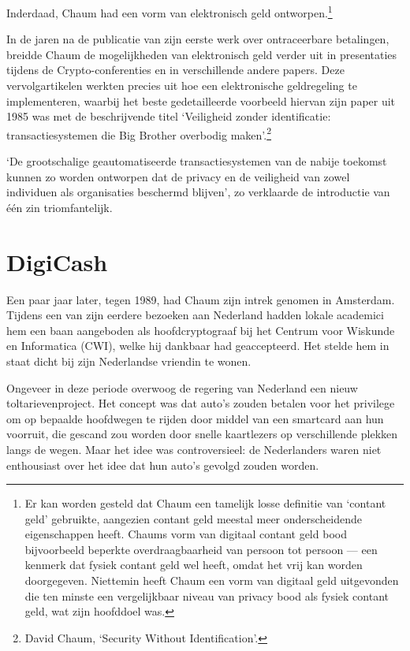 \documentclass[
  a5paper,
  smalldemyvopaper,11pt,twoside,onecolumn,openright,extrafontsizes]{memoir}
\begin{document}
Inderdaad, Chaum had een vorm van elektronisch geld
ontworpen.\footnote{Er kan worden gesteld dat Chaum een tamelijk losse
  definitie van `contant geld' gebruikte, aangezien contant geld meestal
  meer onderscheidende eigenschappen heeft. Chaums vorm van digitaal
  contant geld bood bijvoorbeeld beperkte overdraagbaarheid van persoon
  tot persoon --- een kenmerk dat fysiek contant geld wel heeft, omdat
  het vrij kan worden doorgegeven. Niettemin heeft Chaum een vorm van
  digitaal geld uitgevonden die ten minste een vergelijkbaar niveau van
  privacy bood als fysiek contant geld, wat zijn hoofddoel was.}

In de jaren na de publicatie van zijn eerste werk over ontraceerbare
betalingen, breidde Chaum de mogelijkheden van elektronisch geld verder
uit in presentaties tijdens de Crypto-conferenties en in verschillende
andere papers. Deze vervolgartikelen werkten precies uit hoe een
elektronische geldregeling te implementeren, waarbij het beste
gedetailleerde voorbeeld hiervan zijn paper uit 1985 was met de
beschrijvende titel `Veiligheid zonder identificatie: transactiesystemen
die Big Brother overbodig maken'.\footnote{David Chaum, `Security
  Without Identification'.}

`De grootschalige geautomatiseerde transactiesystemen van de nabije
toekomst kunnen zo worden ontworpen dat de privacy en de veiligheid van
zowel individuen als organisaties beschermd blijven', zo verklaarde de
introductie van één zin triomfantelijk.

\section{DigiCash}\label{digicash}

Een paar jaar later, tegen 1989, had Chaum zijn intrek genomen in
Amsterdam. Tijdens een van zijn eerdere bezoeken aan Nederland hadden
lokale academici hem een baan aangeboden als hoofdcryptograaf bij het
Centrum voor Wiskunde en Informatica (CWI), welke hij dankbaar had
geaccepteerd. Het stelde hem in staat dicht bij zijn Nederlandse
vriendin te wonen.

Ongeveer in deze periode overwoog de regering van Nederland een nieuw
toltarievenproject. Het concept was dat auto's zouden betalen voor het
privilege om op bepaalde hoofdwegen te rijden door middel van een
smartcard aan hun voorruit, die gescand zou worden door snelle
kaartlezers op verschillende plekken langs de wegen. Maar het idee was
controversieel: de Nederlanders waren niet enthousiast over het idee dat
hun auto's gevolgd zouden worden.
\end{document}
